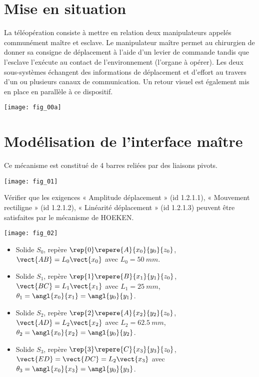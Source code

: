 \begin{multicols}{2}


\section*{Mise en situation}
\ifprof
\else
La téléopération consiste à mettre en relation deux manipulateurs appelés communément
maître et esclave. Le manipulateur maître permet au chirurgien de donner sa consigne de
déplacement à l’aide d’un levier de commande tandis que l’esclave l’exécute au contact de
l’environnement (l’organe à opérer). Les deux sous-systèmes échangent des informations de
déplacement et d’effort au travers d’un ou plusieurs canaux de communication. Un retour
visuel est également mis en place en parallèle à ce dispositif.

\begin{center}
\texttt{[image: fig\_00a]}
\end{center}
\fi

\section*{Modélisation de l’interface maître}
\ifprof
\else

Ce mécanisme est constitué de 4 barres reliées par des liaisons pivots.

\begin{center}
\texttt{[image: fig\_01]}
\end{center}

\begin{obj}
Vérifier que les exigences « Amplitude déplacement » (id 1.2.1.1), « Mouvement
rectiligne » (id 1.2.1.2), « Linéarité déplacement » (id 1.2.1.3) peuvent être satisfaites par le mécanisme de HOEKEN.
\end{obj}


\begin{center}
\texttt{[image: fig\_02]}
\end{center}

\begin{itemize}
\item Solide $S_0$, repère $\rep{0}\repere{A}{x_0}{y_0}{z_0}$, $\vect{AB}=L_0\vect{x_0}$ avec $L_0 = \SI{50}{mm}$.
\item Solide $S_1$, repère $\rep{1}\repere{B}{x_1}{y_1}{z_0}$, $\vect{BC}=L_1\vect{x_1}$ avec $L_1 = \SI{25}{mm}$, $\theta_1=\angl{x_0}{x_1}=\angl{y_0}{y_1}$.
\item Solide $S_2$, repère $\rep{2}\repere{A}{x_2}{y_2}{z_0}$, $\vect{AD}=L_2\vect{x_2}$ avec $L_2 = \SI{62,5}{mm}$, $\theta_2=\angl{x_0}{x_2}=\angl{y_0}{y_2}$.
\item Solide $S_3$, repère $\rep{3}\repere{C}{x_3}{y_3}{z_0}$, $\vect{ED}=\vect{DC}=L_2\vect{x_3}$ avec  $\theta_3=\angl{x_0}{x_3}=\angl{y_0}{y_3}$.
\end{itemize}
\fi


\end{multicols}
